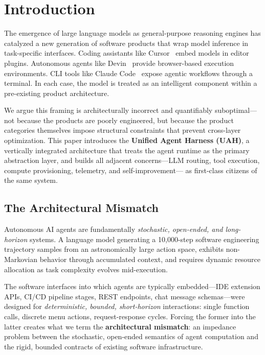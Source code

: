 \documentclass[11pt]{article}
\begin{document}
\section{Introduction}
\label{sec:intro}

The emergence of large language models as general-purpose reasoning engines has
catalyzed a new generation of software products that wrap model inference in
task-specific interfaces. Coding assistants like Cursor~\cite{cursor2024} embed
models in editor plugins. Autonomous agents like
Devin~\cite{cognition2024devin} provide browser-based execution environments.
CLI tools like Claude Code~\cite{anthropic2024claude} expose agentic workflows
through a terminal. In each case, the model is treated as an intelligent
component within a pre-existing product architecture.

We argue this framing is architecturally incorrect and quantifiably
suboptimal---not because the products are poorly engineered, but because the
product categories themselves impose structural constraints that prevent
cross-layer optimization. This paper introduces the \textbf{Unified Agent
Harness (UAH)}, a vertically integrated architecture that treats the agent
runtime as the primary abstraction layer, and builds all adjacent concerns---LLM
routing, tool execution, compute provisioning, telemetry, and self-improvement---
as first-class citizens of the same system.

\subsection{The Architectural Mismatch}

Autonomous AI agents are fundamentally \emph{stochastic, open-ended, and
long-horizon} systems. A language model generating a 10,000-step software
engineering trajectory samples from an astronomically large action space,
exhibits non-Markovian behavior through accumulated context, and requires
dynamic resource allocation as task complexity evolves mid-execution.

The software interfaces into which agents are typically embedded---IDE extension
APIs, CI/CD pipeline stages, REST endpoints, chat message schemas---were
designed for \emph{deterministic, bounded, short-horizon} interactions:
single function calls, discrete menu actions, request-response cycles. Forcing
the former into the latter creates what we term the \textbf{architectural
mismatch}: an impedance problem between the stochastic, open-ended semantics of
agent computation and the rigid, bounded contracts of existing software
infrastructure.
\end{document}
